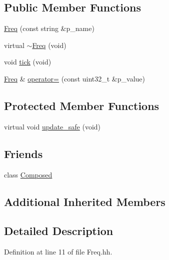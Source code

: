 \subsection*{Public Member Functions}
\begin{DoxyCompactItemize}
\item 
\hyperlink{classxtd_1_1counters_1_1Freq_ac48f859e66bef29a24a2cd9e2ad2aff6}{Freq} (const string \&p\-\_\-name)
\item 
virtual \hyperlink{classxtd_1_1counters_1_1Freq_ac5d39dc4ea5211f48bf6f4834fe2558b}{$\sim$\-Freq} (void)
\item 
void \hyperlink{classxtd_1_1counters_1_1Freq_a9e91ea45fc5e9874dc81ca4bd723efc6}{tick} (void)
\item 
\hyperlink{classxtd_1_1counters_1_1Freq}{Freq} \& \hyperlink{classxtd_1_1counters_1_1Freq_a622e28502b8613bbac6fd40f324ddb8c}{operator=} (const uint32\-\_\-t \&p\-\_\-value)
\end{DoxyCompactItemize}
\subsection*{Protected Member Functions}
\begin{DoxyCompactItemize}
\item 
virtual void \hyperlink{classxtd_1_1counters_1_1Freq_af4ee512e594def96c8bd907d2a369729}{update\-\_\-safe} (void)
\end{DoxyCompactItemize}
\subsection*{Friends}
\begin{DoxyCompactItemize}
\item 
class \hyperlink{classxtd_1_1counters_1_1Freq_a93e934ad70d5b32b14beed5572450abf}{Composed}
\end{DoxyCompactItemize}
\subsection*{Additional Inherited Members}


\subsection{Detailed Description}


Definition at line 11 of file Freq.\-hh.



